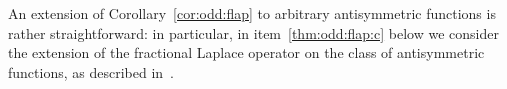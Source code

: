 \documentclass[a4paper,12pt,reqno]{amsart}
\numberwithin{equation}{section}
\theoremstyle{definition}
\theoremstyle{notation}
\newcommand{\R}{\mathds{R}}
\begin{document}


An extension of Corollary~\ref{cor:odd:flap} to arbitrary antisymmetric functions is rather straightforward: in particular, in item~\ref{thm:odd:flap:c} below we consider the extension of the fractional Laplace operator on the class of antisymmetric functions, as described in~\cite{dtv}.
\end{document}
